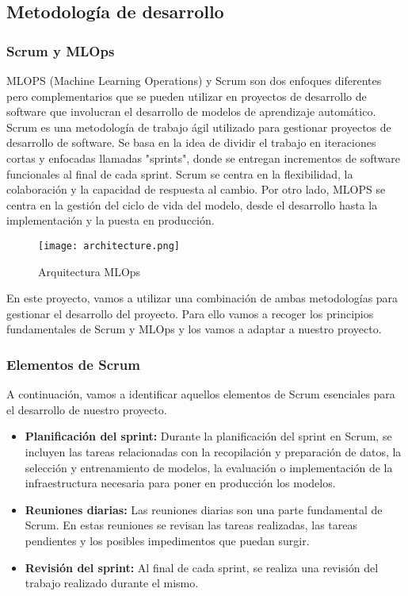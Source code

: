 \subsection{Metodología de desarrollo}
\subsubsection{Scrum y MLOps}
MLOPS (Machine Learning Operations)\cite{MLOpsKeepCoding} y Scrum son dos enfoques diferentes pero complementarios que se pueden 
utilizar en proyectos de desarrollo de software que involucran el desarrollo de modelos de aprendizaje automático. 
Scrum es una metodología de trabajo ágil utilizado para gestionar proyectos de desarrollo de software. Se basa 
en la idea de dividir el trabajo en iteraciones cortas y enfocadas llamadas "sprints", donde se entregan incrementos 
de software funcionales al final de cada sprint. Scrum se centra en la flexibilidad, la colaboración y la capacidad 
de respuesta al cambio. Por otro lado, MLOPS se centra en la gestión del ciclo de vida del modelo, desde el 
desarrollo hasta la implementación y la puesta en producción.

\begin{figure}[ht]
    \centering
    \texttt{[image: architecture.png]}
    \caption{Arquitectura MLOps}
    \label{fig:architecure-mlops}
\end{figure}

En este proyecto, vamos a utilizar una combinación de ambas metodologías para gestionar el desarrollo del proyecto.
Para ello vamos a recoger los principios fundamentales de Scrum y MLOps y los vamos a adaptar a nuestro proyecto.

\subsubsection{Elementos de Scrum}
A continuación, vamos a identificar aquellos elementos de Scrum esenciales para el desarrollo de nuestro proyecto.

\begin{itemize}
      \item \textbf{Planificación del sprint:} Durante la planificación del sprint en Scrum, se incluyen las
      tareas relacionadas con la recopilación y preparación de datos, la selección y entrenamiento de modelos, 
      la evaluación o implementación de la infraestructura necesaria para poner en producción los modelos.
      \item \textbf{Reuniones diarias:} Las reuniones diarias son una parte fundamental de Scrum. En estas reuniones
      se revisan las tareas realizadas, las tareas pendientes y los posibles impedimentos que puedan surgir.
      \item \textbf{Revisión del sprint:} Al final de cada sprint, se realiza una revisión del trabajo realizado
      durante el mismo.
\end{itemize}

